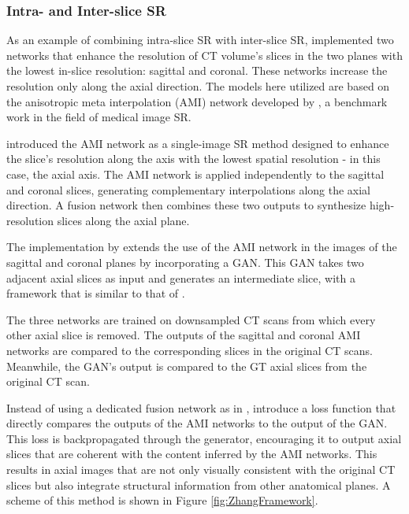 \subsubsection{Intra- and Inter-slice SR}

As an example of combining intra-slice SR with inter-slice SR, \textcite{Zhang2024} implemented two networks that enhance the resolution of CT volume's slices in the two planes with the lowest in-slice resolution: sagittal and coronal. These networks increase the resolution only along the axial direction. The models here utilized are based on the anisotropic meta interpolation (AMI) network developed by \textcite{Peng2020}, a benchmark work in the field of medical image SR. 
\par
\textcite{Peng2020} introduced the AMI network as a single-image SR method designed to enhance the slice's resolution along the axis with the lowest spatial resolution - in this case, the axial axis. The AMI network is applied independently to the sagittal and coronal slices, generating complementary interpolations along the axial direction. A fusion network then combines these two outputs to synthesize high-resolution slices along the axial plane.
\par
The implementation by \textcite{Zhang2024} extends the use of the AMI network in the images of the sagittal and coronal planes by incorporating a GAN. This GAN takes two adjacent axial slices as input and generates an intermediate slice, with a framework that is similar to that of \textcite{Lopez2023}.
\par
The three networks are trained on downsampled CT scans from which every other axial slice is removed. The outputs of the sagittal and coronal AMI networks are compared to the corresponding slices in the original CT scans. Meanwhile, the GAN's output is compared to the GT axial slices from the original CT scan.
\par
Instead of using a dedicated fusion network as in \textcite{Peng2020}, \textcite{Zhang2024} introduce a loss function that directly compares the outputs of the AMI networks to the output of the GAN. This loss is backpropagated through the generator, encouraging it to output axial slices that are coherent with the content inferred by the AMI networks. This results in axial images that are not only visually consistent with the original CT slices but also integrate structural information from other anatomical planes. A scheme of this method is shown in Figure \ref{fig:ZhangFramework}.

